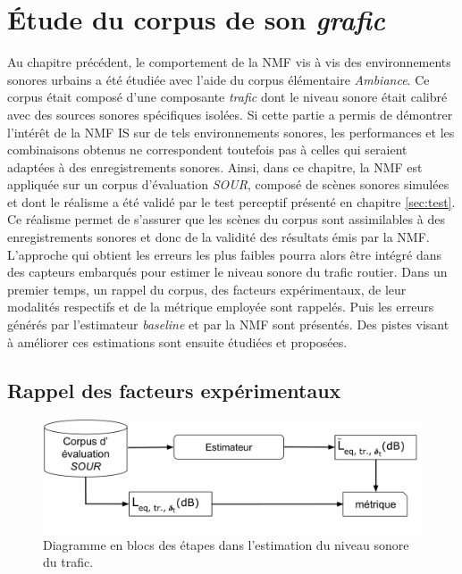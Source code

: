 
\chapter{\'Etude du corpus de son \textit{grafic}}
\label{chap:grafic}

Au chapitre précédent, le comportement de la NMF vis à vis des environnements sonores urbains a été étudiée avec l'aide du corpus élémentaire \textit{Ambiance}. Ce corpus était composé d'une composante \textit{trafic} dont le niveau sonore était calibré avec des sources sonores spécifiques isolées. Si cette partie a permis de démontrer l'intérêt de la NMF IS sur de tels environnements sonores, les performances et les combinaisons obtenus ne correspondent toutefois pas à celles qui seraient adaptées à des enregistrements sonores. Ainsi, dans ce chapitre, la NMF est appliquée sur un corpus d'évaluation \textit{SOUR}, composé de scènes sonores simulées et dont le réalisme a été validé par le test perceptif présenté en chapitre \ref{sec:test}. Ce réalisme permet de s'assurer que les scènes du corpus sont assimilables à des enregistrements sonores et donc de la validité des résultats émis par la NMF. L'approche qui obtient les erreurs les plus faibles pourra alors être intégré dans des capteurs embarqués pour estimer le niveau sonore du trafic routier. Dans un premier temps, un rappel du corpus, des facteurs expérimentaux, de leur modalités respectifs et de la métrique employée sont rappelés. Puis les erreurs générés par l'estimateur \textit{baseline} et par la NMF sont présentés. Des pistes visant à améliorer ces estimations sont ensuite étudiées et proposées.

\section{Rappel des facteurs expérimentaux}
 

\begin{figure}[hbtp]
\centering
\includegraphics[width=0.9\linewidth]{./figures/NMF/Bloc_diagram_estimateur_SOUR.pdf}
\caption{Diagramme en blocs des étapes dans l'estimation du niveau sonore du trafic.}
\label{fig:diagram_SOUR}
\end{figure}


